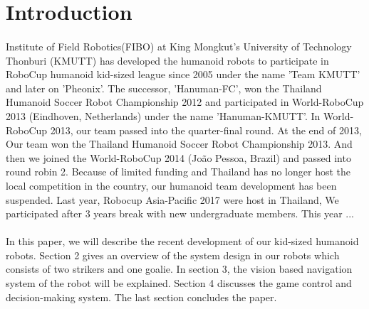 \section{Introduction}
\paragraph{}
Institute of Field Robotics(FIBO) at King Mongkut's University of Technology Thonburi (KMUTT) has developed the humanoid robots to participate in RoboCup humanoid kid-sized league since 2005 under the name 'Team KMUTT' and later on 'Pheonix'. The successor, 'Hanuman-FC', won the Thailand Humanoid Soccer Robot Championship 2012 and participated in World-RoboCup 2013 (Eindhoven, Netherlands) under the name 'Hanuman-KMUTT'. In World-RoboCup 2013, our team passed into the quarter-final round. At the end of 2013, Our team won the Thailand Humanoid Soccer Robot Championship 2013. And then we joined the World-RoboCup 2014 (João Pessoa, Brazil) and passed into round robin 2. Because of limited funding and Thailand has no longer host the local competition in the country, our humanoid team development has been suspended. Last year, Robocup Asia-Pacific 2017 were host in Thailand, We participated after 3 years break with new undergraduate members. This year ...
\paragraph{}
In this paper, we will describe the recent development of our kid-sized humanoid robots. Section 2 gives an overview of the system design in our robots which consists of two strikers and one goalie. In section 3, the vision based navigation system of the robot will be explained. Section 4 discusses the game control and decision-making system. The last section concludes the paper.